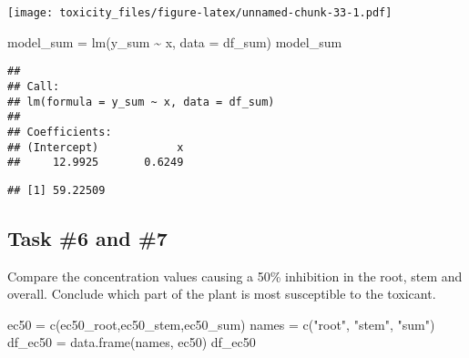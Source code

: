 \documentclass[
]{article}
\newenvironment{Shaded}{\begin{snugshade}}{\end{snugshade}}
\newcommand{\AttributeTok}[1]{\textcolor[rgb]{0.77,0.63,0.00}{#1}}
\newcommand{\DecValTok}[1]{\textcolor[rgb]{0.00,0.00,0.81}{#1}}
\newcommand{\FunctionTok}[1]{\textcolor[rgb]{0.00,0.00,0.00}{#1}}
\newcommand{\NormalTok}[1]{#1}
\newcommand{\OtherTok}[1]{\textcolor[rgb]{0.56,0.35,0.01}{#1}}
\newcommand{\SpecialCharTok}[1]{\textcolor[rgb]{0.00,0.00,0.00}{#1}}
\newcommand{\StringTok}[1]{\textcolor[rgb]{0.31,0.60,0.02}{#1}}
\begin{document}
\texttt{[image: toxicity\_files/figure-latex/unnamed-chunk-33-1.pdf]}

\begin{Shaded}
\begin{Highlighting}[]
\NormalTok{model\_sum }\OtherTok{=} \FunctionTok{lm}\NormalTok{(y\_sum }\SpecialCharTok{\textasciitilde{}}\NormalTok{ x, }\AttributeTok{data =}\NormalTok{ df\_sum)}
\NormalTok{model\_sum}
\end{Highlighting}
\end{Shaded}

\begin{verbatim}
## 
## Call:
## lm(formula = y_sum ~ x, data = df_sum)
## 
## Coefficients:
## (Intercept)            x  
##     12.9925       0.6249
\end{verbatim}

\begin{Shaded}
\end{Shaded}

\begin{verbatim}
## [1] 59.22509
\end{verbatim}

\hypertarget{task-6-and-7}{%
\subsection{Task \#6 and \#7}\label{task-6-and-7}}

Compare the concentration values causing a 50\% inhibition in the root,
stem and overall. Conclude which part of the plant is most susceptible
to the toxicant.

\begin{Shaded}
\begin{Highlighting}[]
\NormalTok{ec50 }\OtherTok{=} \FunctionTok{c}\NormalTok{(ec50\_root,ec50\_stem,ec50\_sum)}
\NormalTok{names }\OtherTok{=} \FunctionTok{c}\NormalTok{(}\StringTok{"root"}\NormalTok{, }\StringTok{"stem"}\NormalTok{, }\StringTok{"sum"}\NormalTok{)}
\NormalTok{df\_ec50 }\OtherTok{=} \FunctionTok{data.frame}\NormalTok{(names, ec50)}
\NormalTok{df\_ec50}
\end{Highlighting}
\end{Shaded}
\end{document}
